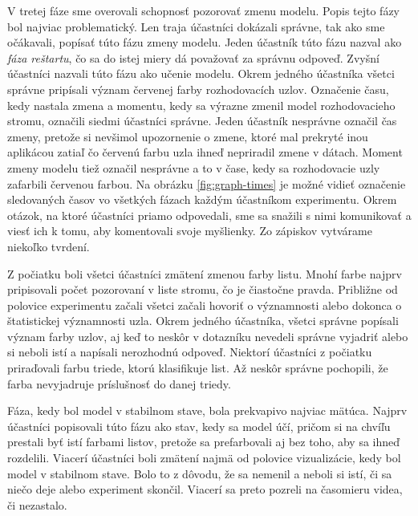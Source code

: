\par
V tretej fáze sme overovali schopnosť pozorovať zmenu modelu. Popis tejto fázy bol najviac problematický. Len traja účastníci dokázali správne, tak ako sme očákavali, popísať túto fázu zmeny modelu. Jeden účastník túto fázu nazval ako \textit{fáza reštartu}, čo sa do istej miery dá považovať za správnu odpoveď. Zvyšní účastníci nazvali túto fázu ako učenie modelu. Okrem jedného účastníka všetci správne pripísali význam červenej farby rozhodovacích uzlov. Označenie času, kedy nastala zmena a momentu, kedy sa výrazne zmenil model rozhodovacieho stromu, označili siedmi účastníci správne. Jeden účastník nesprávne označil čas zmeny, pretože si nevšimol upozornenie o zmene, ktoré mal prekryté inou aplikácou zatiaľ čo červenú farbu uzla ihneď nepriradil zmene v dátach. Moment zmeny modelu tiež označil nesprávne a to v čase, kedy sa rozhodovacie uzly zafarbili červenou farbou. Na obrázku \ref{fig:graph-times} je možné vidieť označenie sledovaných časov vo všetkých fázach každým účastníkom experimentu.
\label{fig:graph-times}
Okrem otázok, na ktoré účastníci priamo odpovedali, sme sa snažili s nimi komunikovať a viesť ich k tomu, aby komentovali svoje myšlienky. Zo zápiskov vytvárame niekoľko tvrdení.
\par
Z počiatku boli všetci účastníci zmätení zmenou farby listu. Mnohí farbe najprv pripisovali počet pozorovaní v liste stromu, čo je čiastočne pravda. Približne od polovice experimentu začali všetci začali hovoriť o významnosti alebo dokonca o štatistickej významnosti uzla. Okrem jedného účastníka, všetci správne popísali význam farby uzlov, aj keď to neskôr v dotazníku nevedeli správne vyjadriť alebo si neboli istí a napísali nerozhodnú odpoveď. Niektorí účastníci z počiatku priraďovali farbu triede, ktorú klasifikuje list. Až neskôr správne pochopili, že farba nevyjadruje príslušnosť do danej triedy.
\par
Fáza, kedy bol model v stabilnom stave, bola prekvapivo najviac mätúca. Najprv účastníci popisovali túto fázu ako stav, kedy sa model účí, pričom si na chvíľu prestali byť istí farbami listov, pretože sa prefarbovali aj bez toho, aby sa ihneď rozdelili. Viacerí účastníci boli zmätení najmä od polovice vizualizácie, kedy bol model v stabilnom stave. Bolo to z dôvodu, že sa nemenil a neboli si istí, či sa niečo deje alebo experiment skončil. Viacerí sa preto pozreli na časomieru videa, či nezastalo.
